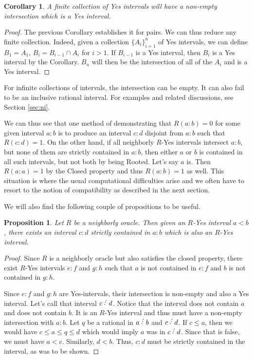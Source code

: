 \documentclass[12pt]{article}
\newtheorem{corollary}{Corollary}[subsection]
\newtheorem{proposition}{Proposition}[subsection]
\begin{document}
\begin{corollary}\label{cor:finite-inter}
    A finite collection of Yes intervals will have a non-empty intersection which is a Yes interval. 
\end{corollary}

\begin{proof}
The previous Corollary establishes it for pairs. We can thus reduce any finite collection. Indeed, given a collection $\{A_i\}_{i=1}^n$ of Yes intervals, we can define $B_1 = A_1$, $B_i = B_{i-1} \cap A_i$ for $i > 1$. If $B_{i-1}$ is a Yes interval, then $B_i$ is a Yes interval by the Corollary. $B_n$ will then be the intersection of all of the $A_i$ and is a Yes interval.  
\end{proof}

For infinite collections of intervals, the intersection can be empty. It can also fail to be an inclusive rational interval. For examples and related discussions, see Section \ref{sec:ni}. 

We can thus see that one method of demonstrating that $R(a:b)=0$ for some given interval $a:b$ is to produce an interval $c:d$ disjoint from $a:b$ such that $R(c:d)=1$. On the other hand, if all neighborly $R$-Yes intervals intersect $a:b$, but none of them are strictly contained in $a:b$, then either $a$ or $b$ is contained in all such intervals, but not both by being Rooted. Let's say $a$ is. Then $R(a:a)=1$ by the Closed property and thus $R(a:b)=1$ as well. This situation is where the usual computational difficulties arise and we often have to resort to the notion of compatibility as described in the next section. 

We will also find the following couple of propositions to be useful. 

\begin{proposition}\label{pr:subinter}
Let $R$ be a neighborly oracle. Then given an $R$-Yes interval $a\lt b$, there exists an interval $c:d$ strictly contained in $a:b$ which is also an $R$-Yes interval. 
\end{proposition}

\begin{proof}
Since $R$ is a neighborly oracle but also satisfies the closed property, there exist $R$-Yes intervals $e:f$ and $g:h$ such that $a$ is not contained in $e:f$ and $b$ is not contained in $g:h$. 

Since $e:f$ and $g:h$ are Yes-intervals, their intersection is non-empty and also a Yes interval. Let's call that interval $c\lte d$.  Notice that the interval does not contain $a$ and does not contain $b$. It is an $R$-Yes interval and thus must have a non-empty intersection with $a:b$. Let $q$ be a rational in $a\lte b$ and $c \lte d$. If $c\leq a$, then we would have $c \leq a \leq q \leq d$ which would imply $a$ was in $c \lte d$. Since that is false, we must have $a < c$. Similarly, $d < b$. Thus, $c:d$ must be strictly contained in the interval, as was to be shown. 
\end{proof}
\end{document}
